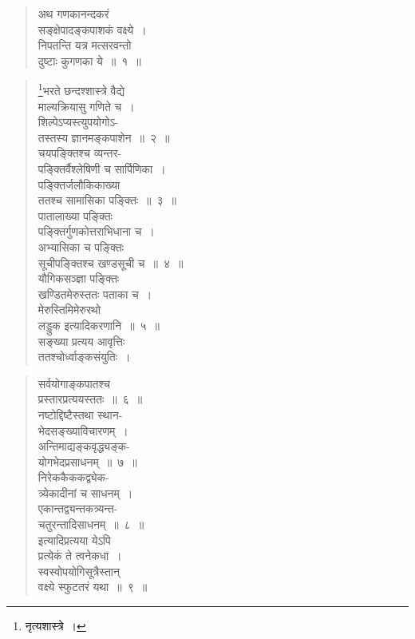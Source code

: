 \documentclass[11pt, openany]{book}
\begin{document}
\begin{quote}
{\gk अथ गणकानन्दकरं\\
सङ्क्षेपादङ्कपाशकं वक्ष्ये~।\\
निपतन्ति यत्र मत्सरवन्तो\\
दुष्टाः कुगणका ये~॥~१~॥}
\end{quote}

\newpage

\begin{quote}
\renewcommand{\thefootnote}{१}\footnote{नृत्यशास्त्रे~।}{\gk भरते छन्दश्शास्त्रे वैद्ये\\
माल्यक्रियासु गणिते च~।\\
शिल्पेऽप्यस्त्युपयोगोऽ-\\
तस्तस्य ज्ञानमङ्कपाशेन~॥~२~॥\\
चयपङ्क्तिश्च व्यन्तर-\\
पङ्क्तिर्वैश्लेषिणी च सार्पिणिका~।\\
पङ्क्तिर्जलौकिकाख्या\\
ततश्च सामासिका पङ्क्तिः~॥~३~॥\\
पातालाख्या पङ्क्तिः\\
पङ्क्तिर्गुणकोत्तराभिधाना च~।\\
अभ्यासिका च पङ्क्तिः\\
सूचीपङ्क्तिश्च खण्डसूची च~॥~४~॥\\
यौगिकसञ्ज्ञा पङ्क्तिः\\
खण्डितमेरुस्ततः पताका च~।\\
मेरुस्तिमिमेरुरथो\\
लड्डुक इत्यादिकरणानि~॥~५~॥\\
सङ्ख्या प्रत्यय आवृत्तिः\\
ततश्चोर्ध्वाङ्कसंयुतिः~।}
\end{quote}

\newpage

\begin{quote}
{\gk सर्वयोगाङ्कपातश्च\\
प्रस्तारप्रत्ययस्ततः~॥~६~॥\\
नष्टोद्दिष्टैस्तथा स्थान-\\
भेदसङ्ख्याविचारणम्~।\\
अन्तिमाद्यङ्कवृद्ध्यङ्क-\\
योगभेदप्रसाधनम्~॥~७~॥\\
निरेककैककद्व्येक-\\
त्र्येकादीनां च साधनम्~।\\
एकान्तद्व्यन्तकत्र्यन्त-\\
चतुरन्तादिसाधनम्~॥~८~॥\\
इत्यादिप्रत्यया येऽपि\\
प्रत्येकं ते त्वनेकधा~।\\
स्वस्वोपयोगिसूत्रैस्तान्\\
वक्ष्ये स्फुटतरं यथा~॥~९~॥~}
\end{quote}
\end{document}
